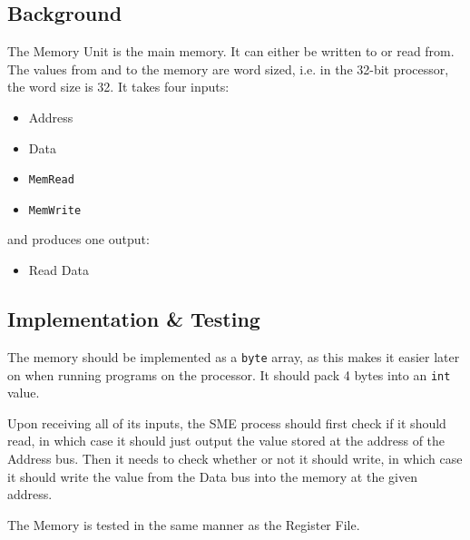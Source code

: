 \documentclass{beamer}
\begin{document}
\subsection{Background}
\begin{frame}
    The Memory Unit is the main memory. It can either be written to or read
    from. The values from and to the memory are word sized, i.e. in the 32-bit
    processor, the word size is 32. It takes four inputs:
    \begin{itemize}
        \item Address
        \item Data
        \item \texttt{MemRead}
        \item \texttt{MemWrite}
    \end{itemize}
    and produces one output:
    \begin{itemize}
        \item Read Data
    \end{itemize}
\end{frame}
\begin{frame}
    \begin{figure}
    \end{figure}
\end{frame}
\subsection{Implementation \& Testing}
\begin{frame}
    The memory should be implemented as a \texttt{byte} array, as this makes it
    easier later on when running programs on the processor. It should pack 4
    bytes into an \texttt{int} value.

    \vspace{\baselineskip}
    Upon receiving all of its inputs, the SME process should first check if it
    should read, in which case it should just output the value stored at the
    address of the Address bus. Then it needs to check whether or not it should
    write, in which case it should write the value from the Data bus into the
    memory at the given address.

    \vspace{\baselineskip}
    The Memory is tested in the same manner as the Register File.
\end{frame}
\end{document}

